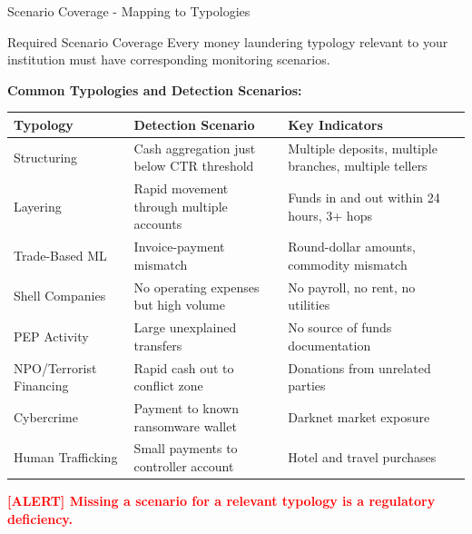 \documentclass[11pt,a4paper]{beamer}
\newcommand{\redflag}[1]{\textcolor{red}{\textbf{[ALERT] #1}}}
\begin{document}
	\begin{frame}{Scenario Coverage - Mapping to Typologies}
		\begin{block}{Required Scenario Coverage}
			Every money laundering typology relevant to your institution must have corresponding monitoring scenarios.
		\end{block}
		
		\textbf{Common Typologies and Detection Scenarios:}
		\begin{longtable}{p{}|p{}|p{}}
			\hline
			\rowcolor{lightgray}
			\textbf{Typology} & \textbf{Detection Scenario} & \textbf{Key Indicators} \\
			\hline
			Structuring & Cash aggregation just below CTR threshold & Multiple deposits, multiple branches, multiple tellers \\
			\hline
			Layering & Rapid movement through multiple accounts & Funds in and out within 24 hours, 3+ hops \\
			\hline
			Trade-Based ML & Invoice-payment mismatch & Round-dollar amounts, commodity mismatch \\
			\hline
			Shell Companies & No operating expenses but high volume & No payroll, no rent, no utilities \\
			\hline
			PEP Activity & Large unexplained transfers & No source of funds documentation \\
			\hline
			NPO/Terrorist Financing & Rapid cash out to conflict zone & Donations from unrelated parties \\
			\hline
			Cybercrime & Payment to known ransomware wallet & Darknet market exposure \\
			\hline
			Human Trafficking & Small payments to controller account & Hotel and travel purchases \\
			\hline
		\end{longtable}
		
		\redflag{Missing a scenario for a relevant typology is a regulatory deficiency.}
	\end{frame}
	
\end{document}
